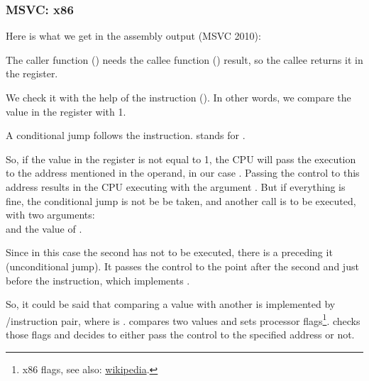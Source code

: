\subsubsection{MSVC: x86}

Here is what we get in the assembly output (MSVC 2010):



The \gls{caller} function (\main) needs the \gls{callee} function (\scanf) result, 
so the \gls{callee} returns it in the \EAX register.

We check it with the help of the instruction  (). In other words, we compare the value in the \EAX register with 1.

A \JNE conditional jump follows the \CMP instruction. \JNE stands for .

So, if the value in the \EAX register is not equal to 1, the \ac{CPU} will pass the execution to the address mentioned in the \JNE operand, in our case .
Passing the control to this address results in the \ac{CPU} executing \printf with the argument .
But if everything is fine, the conditional jump is not be be taken, and another \printf call is to be executed, with two arguments:\\
 and the value of .

Since in this case the second \printf has not to be executed, there is a \JMP preceding it (unconditional jump). 
It passes the control to the point after the second \printf and just before the  instruction, which implements .

So, it could be said that comparing a value with another is  implemented by \CMP/\Jcc instruction pair, where  is .
\CMP compares two values and sets processor flags\footnote{x86 flags, see also: \href{http://go.yurichev.com/17120}{wikipedia}.}.
\Jcc checks those flags and decides to either pass the control to the specified address or not.

